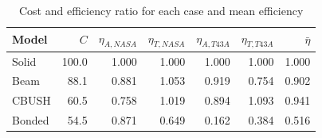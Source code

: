 \begin{table}[H]
    \centering
    \caption{Cost and efficiency ratio for each case and mean efficiency}
    \label{tab:cost_efficiency_ratio_summary}
    \begin{tabular}{lrrrrrr}
        \toprule
        \textbf{Model} & \textbf{$C$} & \textbf{$\eta_{A,NASA}$} & \textbf{$\eta_{T,NASA}$} & \textbf{$\eta_{A,T43A}$} & \textbf{$\eta_{T,T43A}$} & \textbf{$\bar{\eta}$} \\
        \midrule
        Solid & 100.0 & 1.000 & 1.000 & 1.000 & 1.000 & 1.000 \\
        Beam & 88.1 & 0.881 & 1.053 & 0.919 & 0.754 & 0.902 \\
        CBUSH & 60.5 & 0.758 & 1.019 & 0.894 & 1.093 & 0.941 \\
        Bonded & 54.5 & 0.871 & 0.649 & 0.162 & 0.384 & 0.516 \\
        \bottomrule
    \end{tabular}
\end{table}
